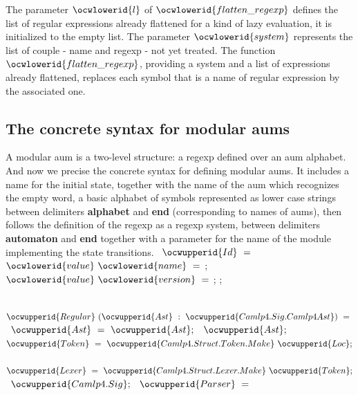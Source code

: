 \documentclass[12pt]{article}
\begin{document}
\ocwendcode{}\ocwindent{0.00em}
The parameter \ocwbegindcode{}$\ocwlowerid{l}$\ocwenddcode{} of \ocwbegindcode{}$\ocwlowerid{flatten\_regexp}$\ocwenddcode{} defines the list of regular expressions
   already flattened for a kind of lazy evaluation, it is initialized to 
   the empty list. The parameter \ocwbegindcode{}$\ocwlowerid{system}$\ocwenddcode{} 
   represents the list of couple - name and regexp - not yet treated. 
   The function \ocwbegindcode{}$\ocwlowerid{flatten\_regexp}$\ocwenddcode{}, providing a system and a list of expressions 
   already flattened, replaces each symbol that is a name of regular
   expression by the associated one. 
\ocweol
\ocwindent{0.00em}
\subsection{The concrete syntax for modular aums} 
\ocweol
\ocwindent{0.00em}
A modular aum is a two-level structure: a regexp defined over an
   aum alphabet.  And now we precise the concrete syntax for
   defining modular aums.  It includes a name for the initial state,
   together with the name of the aum which recognizes the empty word, 
   a basic alphabet of symbols represented as lower case strings between 
   delimiters {\bf alphabet} and {\bf end} (corresponding to names of 
   aums), then follows the definition of the regexp as a regexp system,
   between delimiters {\bf automaton} and {\bf end} together with a
   parameter for the name of the module implementing the state
   transitions. 
\ocweol
\label{../ML/regular.ml:16510}%
\medskip
\ocwbegincode{}\ocwindent{0.00em}
~$\ocwupperid{Id}~=~$\ocweol
\ocwindent{1.00em}
$\ocwlowerid{value}~\ocwlowerid{name}~=~$;\ocweol
\ocwindent{1.00em}
$\ocwlowerid{value}~\ocwlowerid{version}~=~$;\ocweol
\ocwindent{0.00em}
;\medskip

\label{../ML/regular.ml:16586}%
\ocwindent{0.00em}
~$\ocwupperid{Regular}~(\ocwupperid{Ast}~:~\ocwupperid{Camlp4.Sig.Camlp4Ast})~=~$\ocweol
\ocwindent{1.00em}
~$\ocwupperid{Ast}~=~\ocwupperid{Ast};$\ocweol
\ocwindent{1.00em}
~$\ocwupperid{Ast};$\ocweol
\ocwindent{1.00em}
~$\ocwupperid{Token}~=~\ocwupperid{Camlp4.Struct.Token.Make}~\ocwupperid{Loc};$\ocweol
\ocwindent{1.00em}
~$\ocwupperid{Lexer}~=~\ocwupperid{Camlp4.Struct.Lexer.Make}~\ocwupperid{Token};$\ocweol
\ocwindent{1.00em}
~$\ocwupperid{Camlp4.Sig};$\ocweol
\ocwindent{1.00em}
~$\ocwupperid{Parser}~=~$\medskip
\end{document}
